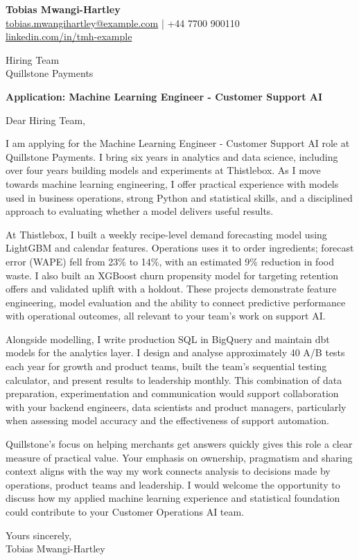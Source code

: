 \documentclass[11pt,a4paper]{article}
\begin{document}
{\large\bfseries\color{primarycolor} Tobias Mwangi-Hartley}\\
\href{mailto:tobias.mwangihartley@example.com}{tobias.mwangihartley@example.com} | +44 7700 900110\\
\href{https://linkedin.com/in/tmh-example}{linkedin.com/in/tmh-example}

Hiring Team\\
Quillstone Payments

\textbf{Application: Machine Learning Engineer - Customer Support AI}

Dear Hiring Team,

I am applying for the Machine Learning Engineer - Customer Support AI role at Quillstone Payments. I bring six years in analytics and data science, including over four years building models and experiments at Thistlebox. As I move towards machine learning engineering, I offer practical experience with models used in business operations, strong Python and statistical skills, and a disciplined approach to evaluating whether a model delivers useful results.

At Thistlebox, I built a weekly recipe-level demand forecasting model using LightGBM and calendar features. Operations uses it to order ingredients; forecast error (WAPE) fell from 23\% to 14\%, with an estimated 9\% reduction in food waste. I also built an XGBoost churn propensity model for targeting retention offers and validated uplift with a holdout. These projects demonstrate feature engineering, model evaluation and the ability to connect predictive performance with operational outcomes, all relevant to your team's work on support AI.

Alongside modelling, I write production SQL in BigQuery and maintain dbt models for the analytics layer. I design and analyse approximately 40 A/B tests each year for growth and product teams, built the team's sequential testing calculator, and present results to leadership monthly. This combination of data preparation, experimentation and communication would support collaboration with your backend engineers, data scientists and product managers, particularly when assessing model accuracy and the effectiveness of support automation.

Quillstone's focus on helping merchants get answers quickly gives this role a clear measure of practical value. Your emphasis on ownership, pragmatism and sharing context aligns with the way my work connects analysis to decisions made by operations, product teams and leadership. I would welcome the opportunity to discuss how my applied machine learning experience and statistical foundation could contribute to your Customer Operations AI team.

Yours sincerely,\\
Tobias Mwangi-Hartley
\end{document}
